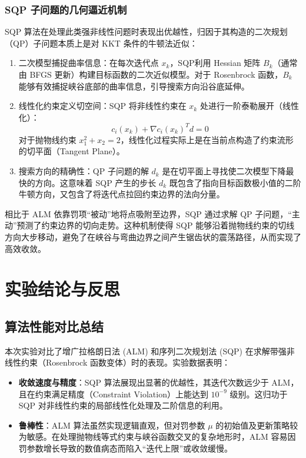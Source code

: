 \documentclass[a4paper,12pt]{article}
\begin{document}
\subsubsection{SQP 子问题的几何逼近机制}
SQP 算法在处理此类强非线性问题时表现出优越性，归因于其构造的二次规划（QP）子问题本质上是对 KKT 条件的牛顿法近似：

\begin{enumerate}
    \item 二次模型捕捉曲率信息：在每次迭代点 $x_k$，SQP利用 Hessian 矩阵 $B_k$（通常由 BFGS 更新）构建目标函数的二次近似模型。对于 Rosenbrock 函数，$B_k$ 能够有效捕捉峡谷底部的曲率信息，引导搜索方向沿谷底延伸。
    
    \item 线性化约束定义切空间：SQP 将非线性约束在 $x_k$ 处进行一阶泰勒展开（线性化）：
    \begin{equation}
        c_i(x_k) + \nabla c_i(x_k)^T d = 0
    \end{equation}
    对于抛物线约束 $x_1^2 + x_2 = 2$，线性化过程实际上是在当前点构造了约束流形的切平面（Tangent Plane）。
    
    \item 搜索方向的精确性：QP 子问题的解 $d_k$ 是在切平面上寻找使二次模型下降最快的方向。这意味着 SQP 产生的步长 $d_k$ 既包含了指向目标函数极小值的二阶牛顿方向，又包含了将迭代点拉回约束边界的法向分量。
\end{enumerate}

相比于 ALM 依靠罚项“被动”地将点吸附至边界，SQP 通过求解 QP 子问题，“主动”预测了约束边界的切向走势。这种机制使得 SQP 能够沿着抛物线约束的切线方向大步移动，避免了在峡谷与弯曲边界之间产生锯齿状的震荡路径，从而实现了高效收敛。


\section{实验结论与反思}

\subsection{算法性能对比总结}
本次实验对比了增广拉格朗日法 (ALM) 和序列二次规划法 (SQP) 在求解带强非线性约束（Rosenbrock 函数变体）时的表现。实验数据表明：
\begin{itemize}
    \item \textbf{收敛速度与精度}：SQP 算法展现出显著的优越性，其迭代次数远少于 ALM，且在约束满足精度（Constraint Violation）上能达到 $10^{-9}$ 级别。这归功于 SQP 对非线性约束的局部线性化处理及二阶信息的利用。
    \item \textbf{鲁棒性}：ALM 算法虽然实现逻辑直观，但对罚参数 $\mu$ 的初始值及更新策略较为敏感。在处理抛物线等式约束与峡谷函数交叉的复杂地形时，ALM 容易因罚参数增长导致的数值病态而陷入“迭代上限”或收敛缓慢。
\end{itemize}
\end{document}
